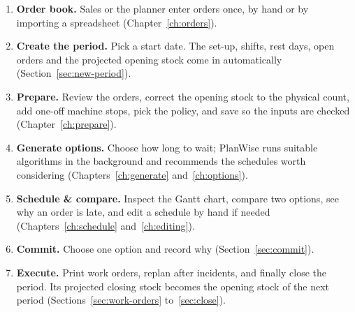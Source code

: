 \begin{enumerate}
  \item \textbf{Order book.} Sales or the planner enter orders once, by hand or by importing a spreadsheet
        (Chapter~\ref{ch:orders}).
  \item \textbf{Create the period.} Pick a start date. The set-up, shifts, rest days, open orders and the
        projected opening stock come in automatically (Section~\ref{sec:new-period}).
  \item \textbf{Prepare.} Review the orders, correct the opening stock to the physical count, add one-off
        machine stops, pick the policy, and save so the inputs are checked (Chapter~\ref{ch:prepare}).
  \item \textbf{Generate options.} Choose how long to wait; PlanWise runs suitable algorithms in the
        background and recommends the schedules worth considering (Chapters~\ref{ch:generate}
        and~\ref{ch:options}).
  \item \textbf{Schedule \& compare.} Inspect the Gantt chart, compare two options, see why an order is late,
        and edit a schedule by hand if needed (Chapters~\ref{ch:schedule} and~\ref{ch:editing}).
  \item \textbf{Commit.} Choose one option and record why (Section~\ref{sec:commit}).
  \item \textbf{Execute.} Print work orders, replan after incidents, and finally close the period. Its
        projected closing stock becomes the opening stock of the next period (Sections~\ref{sec:work-orders}
        to~\ref{sec:close}).
\end{enumerate}
